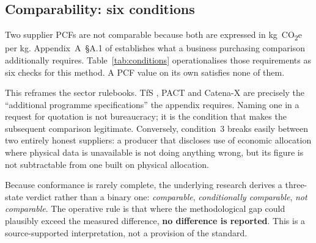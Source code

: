 \documentclass[10pt,twocolumn,a4paper]{article}
\newcommand{\co}{CO\textsubscript{2}e}
\begin{document}
\subsection{Comparability: six conditions}
\label{sec:comparability}

Two supplier PCFs are not comparable because both are expressed in kg~\co{} per
kg. Appendix~A~\S A.1 of \cite{p1} establishes what a business purchasing
comparison additionally requires. Table~\ref{tab:conditions} operationalises
those requirements as six checks for this method. A PCF value on its own
satisfies none of them.

This reframes the sector rulebooks. TfS \cite{b1}, PACT \cite{p3,b2} and
Catena-X \cite{b3} are precisely the ``additional programme specifications'' the
appendix requires. Naming one in a request for quotation is not bureaucracy; it
is the condition that makes the subsequent comparison legitimate. Conversely,
condition~3 breaks easily between two entirely honest suppliers: a producer that
discloses use of economic allocation where physical data is unavailable
\cite{d1} is not doing anything wrong, but its figure is not subtractable from
one built on physical allocation.

Because conformance is rarely complete, the underlying research derives a three-state
verdict rather than a binary one: \emph{comparable}, \emph{conditionally
comparable}, \emph{not comparable}. The operative rule is that where the
methodological gap could plausibly exceed the measured difference, \textbf{no
difference is reported}. This is a source-supported interpretation, not a
provision of the standard.
\end{document}
